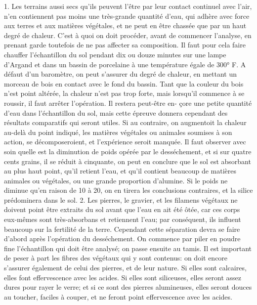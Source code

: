 1. Les terrains aussi secs qu'ils peuvent l'être par leur contact continuel avec l'air, n'en contiennent pas moins une très-grande quantité d'eau, qui adhère avec force aux terres et aux matières végétales, et ne peut en être chassée que par un haut degré de chaleur. C'est à quoi on doit procéder, avant de commencer l'analyse, en prenant garde toutefois de ne pas affecter sa composition. Il faut pour cela faire chauffer l'échantillon du sol pendant dix ou douze minutes sur une lampe d'Argand et dans un bassin de porcelaine à une température égale de 300° F. A défaut d'un baromètre, on peut s'assurer du degré de chaleur, en mettant un morceau de bois en contact avec le fond du bassin. Tant que la couleur du bois n'est point altérée, la chaleur n'est pas trop forte, mais lorsqu'il commence à se roussir, il faut arrêter l'opération. Il restera peut-être en-\setcounter{page}{424} çore une petite quantité d'eau dans l'échantillon du sol, mais cette épreuve donnera cependant des résultats comparatifs qui seront utiles. Si au contraire, on augmentoit la chaleur au-delà du point indiqué, les matières végétales ou animales soumises à son action, se décomposeroient, et l'expérience seroit manquée.
Il faut observer avec soin quelle est la diminution de poids opérée par le desséchement, et si sur quatre cents grains, il se réduit à cinquante, on peut en conclure que le sol est absorbant au plus haut point, qu'il retient l'eau, et qu'il contient beaucoup de matières animales ou végétales, ou une grande proportion d'alumine. Si le poids ne diminue qu'en raison de 10 à 20, on en tirera les conclusions contraires, et la silice prédominera dans le sol.
2. Les pierres, le gravier, et les filamens végétaux ne doivent point être extraits du sol avant que l'eau en ait été ôtée, car ces corps eux-mêmes sont très-absorbans et retiennent l'eau; par conséquent, ils influent beaucoup sur la fertilité de la terre. Cependant cette séparation devra se faire d'abord après l'opération du desséchement. On commence par piler en poudre fine l'échantillon qui doit être analysé; on passe ensuite au\setcounter{page}{425} tamis. Il est important de peser à part les fibres des végétaux qui y sont contenus: on doit encore s'assurer également de celui des pierres, et de leur nature. Si elles sont calcaires, elles font effervescence avec les acides. Si elles sont siliceuses, elles seront assez dures pour rayer le verre; et si ce sont des pierres alumineuses, elles seront douces au toucher, faciles à couper, et ne feront point effervescence avec les acides.
